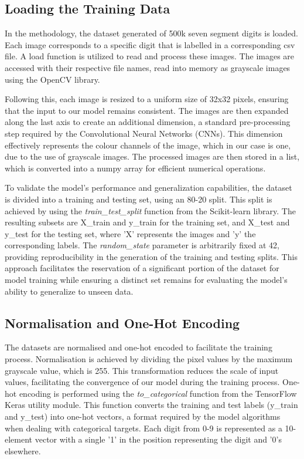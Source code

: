 \subsection{Loading the Training Data}
In the methodology, the dataset generated of 500k seven segment digits is loaded. Each image corresponds to a specific digit that is labelled in a corresponding csv file. A load function is utilized to read and process these images. The images are accessed with their respective file names, read into memory as grayscale images using the OpenCV library.

Following this, each image is resized to a uniform size of 32x32 pixels, ensuring that the input to our model remains consistent. The images are then expanded along the last axis to create an additional dimension, a standard pre-processing step required by the Convolutional Neural Networks (CNNs). This dimension effectively represents the colour channels of the image, which in our case is one, due to the use of grayscale images. The processed images are then stored in a list, which is converted into a numpy array for efficient numerical operations.


To validate the model's performance and generalization capabilities, the dataset is divided into a training and  testing set, using an 80-20 split. This split is achieved by using the \textit{train\_test\_split} function from the Scikit-learn library. The resulting subsets are X\_train and y\_train for the training set, and X\_test and y\_test for the testing set, where 'X' represents the images and 'y' the corresponding labels. The \textit{random\_state} parameter is arbitrarily fixed at 42, providing reproducibility in the generation of the training and testing splits. This approach facilitates the reservation of a significant portion of the dataset for model training while ensuring a distinct set remains for evaluating the model's ability to generalize to unseen data.

\subsection{Normalisation and One-Hot Encoding}
The datasets are normalised and one-hot encoded to facilitate the training process. Normalisation is achieved by dividing the pixel values by the maximum grayscale value, which is 255. This transformation reduces the scale of input values, facilitating the convergence of our model during the training process. One-hot encoding is performed using the \textit{to\_categorical} function from the TensorFlow Keras utility module. This function converts the training and test labels (y\_train and y\_test) into one-hot vectors, a format required by the model algorithms when dealing with categorical targets. Each digit from 0-9 is represented as a 10-element vector with a single '1' in the position representing the digit and '0's elsewhere.



